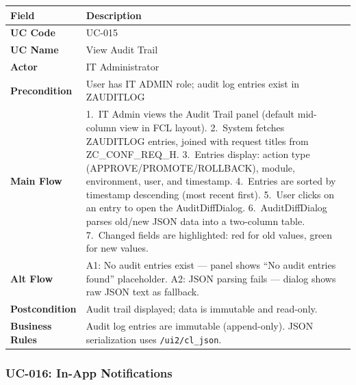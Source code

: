 \documentclass[12pt,a4paper]{report}
\begin{document}
\begin{longtable}{|>{\bfseries}p{2.8cm}|p{12cm}|}
  \hline
  \rowcolor{tableheadpeach}
  \textbf{Field} & \textbf{Description} \\ \hline
  \endhead \hline \endfoot
  UC Code       & UC-015 \\ \hline
  UC Name       & View Audit Trail \\ \hline
  Actor         & IT Administrator \\ \hline
  Precondition  & User has IT ADMIN role; audit log entries exist in ZAUDITLOG \\ \hline
  Main Flow     & 1.~IT Admin views the Audit Trail panel (default mid-column view in FCL layout).
                  2.~System fetches ZAUDITLOG entries, joined with request titles from ZC\_CONF\_REQ\_H.
                  3.~Entries display: action type (APPROVE/PROMOTE/ROLLBACK), module, environment, user, and timestamp.
                  4.~Entries are sorted by timestamp descending (most recent first).
                  5.~User clicks on an entry to open the AuditDiffDialog.
                  6.~AuditDiffDialog parses old/new JSON data into a two-column table.
                  7.~Changed fields are highlighted: red for old values, green for new values. \\ \hline
  Alt Flow      & A1: No audit entries exist --- panel shows ``No audit entries found'' placeholder.
                  A2: JSON parsing fails --- dialog shows raw JSON text as fallback. \\ \hline
  Postcondition & Audit trail displayed; data is immutable and read-only. \\ \hline
  Business Rules& Audit log entries are immutable (append-only). JSON serialization uses \texttt{/ui2/cl\_json}. \\ \hline
\end{longtable}

\subsubsection{UC-016: In-App Notifications}
\end{document}
